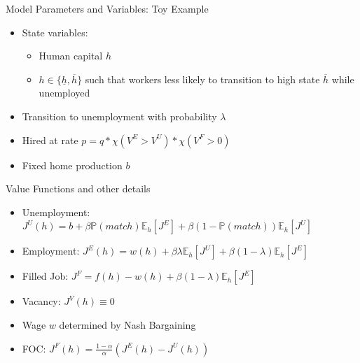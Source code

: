\documentclass[lualatex]{beamer}
\begin{document}
\begin{frame}{Model Parameters and Variables: Toy Example}
	\begin{itemize}

		\item State variables:

		\begin{itemize}
			\item Human capital $h$

			\item $h \in \{\underline{h}, \overline{h}\}$ such that workers less likely to transition to high state $\overline{h}$ while unemployed

		\end{itemize}

		\item Transition to unemployment with probability $\lambda$

		\item Hired at rate $p = q*\chi(V^E>V^U)*\chi(V^F > 0)$

		\item Fixed home production $b$

	\end{itemize}
\end{frame}

\begin{frame}{Value Functions and other details}

		\begin{itemize}

			\item Unemployment: $J^U(h) = b + \beta  \mathbb{P}\left(match\right) \mathbb{E}_h \left[J^E\right] + \beta \left(1-\mathbb{P}\left(match\right)\right) \mathbb{E}_h\left[J^U\right]$

			\item Employment: $J^E(h) = w(h) + \beta  \lambda \mathbb{E}_h\left[J^U\right] + \beta \left(1-\lambda \right) \mathbb{E}_h \left[ J^E \right]$

			\item Filled Job: $J^F = f(h) - w(h) + \beta \left(1-\lambda\right) \mathbb{E}_h\left[ J^E \right]$

			\item Vacancy: $J^V(h) \equiv 0$

			\item Wage $w$ determined by Nash Bargaining

			\item FOC: $J^F(h) = \frac{1-\alpha}{\alpha} \left(J^E(h) - J^U(h) \right)$

	\end{itemize}

\end{frame}
\end{document}
